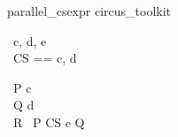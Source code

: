 \begin{zsection}
   \SECTION parallel\_csexpr \parents circus\_toolkit
\end{zsection}

\begin{circus}
   \circchannel\ c, d, e \\
   \circchannelset\ CS == \lchanset c, d \rchanset
\end{circus}

\begin{circus}
   \circprocess\ P \circdef \circbegin \circspot c \then \Skip \circend
   \\
   \circprocess\ Q \circdef \circbegin \circspot d \then \Skip \circend
   \\
   \circprocess\ R \circdef\ P \lpar CS \cup \lchanset e \rchanset \rpar Q
\end{circus}
